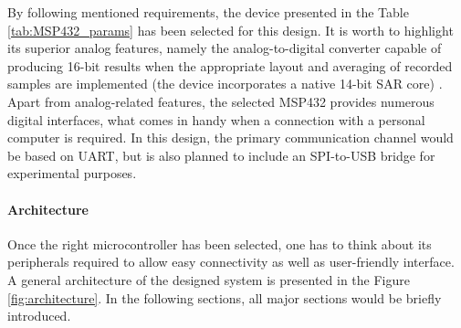 \documentclass[12pt,a4paper]{article}
\begin{document}
\par
By following mentioned requirements, the device presented in the Table \ref{tab:MSP432_params} has been selected for this design. It is worth to highlight its superior analog features, namely the analog-to-digital converter capable of producing 16-bit results when the appropriate layout and averaging of recorded samples are implemented (the device incorporates a native 14-bit SAR core) \cite{16bit}. Apart from analog-related features, the selected MSP432 provides numerous digital interfaces, what comes in handy when a connection with a personal computer is required. In this design, the primary communication channel would be based on UART, but is also planned to include an SPI-to-USB bridge for experimental purposes.
\par

\paragraph{Architecture}
Once the right microcontroller has been selected, one has to think about its peripherals required to allow easy connectivity as well as user-friendly interface. A general architecture of the designed system is presented in the Figure \ref{fig:architecture}. In the following sections, all major sections would be briefly introduced.
\end{document}
